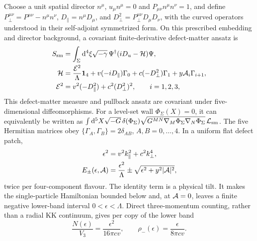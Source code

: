\documentclass[10pt]{article}
\newcommand{\dd}{\mathrm{d}}
\begin{document}
Choose a unit spatial director $n^\mu$, $u_\mu n^\mu=0$ and
$P_{\mu\nu}n^\mu n^\nu=1$, and define
$P_\perp^{\mu\nu}=P^{\mu\nu}-n^\mu n^\nu$,
$D_\parallel=n^\mu D_\mu$, and
$D_\perp^2=P_\perp^{\mu\nu}D_\mu D_\nu$, with the curved operators understood
in their self-adjoint symmetrized form.  On this prescribed embedding and
director background, a covariant finite-derivative defect-matter ansatz is
\begin{equation}
 \begin{aligned}
 S_{\rm sm}&=\int_\Sigma\dd^4\xi\sqrt{-\gamma}\,
 \Psi^\dagger(iD_u-{\cal H})\Psi,\\
 {\cal H}&=\frac{{\cal E}^2}{\Lambda}\mathbf1_4
 +v(-iD_\parallel)\Gamma_0+c(-D_\perp^2)\Gamma_1
 +y{\cal A}_i\Gamma_{i+1},\\
 {\cal E}^2&=v^2(-D_\parallel^2)+c^2(D_\perp^2)^2,
 \qquad i=1,2,3,
 \end{aligned}
 \label{eq:tiltedsemimetalaction}
\end{equation}
This defect-matter measure and pullback ansatz are covariant under
five-dimensional diffeomorphisms.  For
a level-set wall $\Phi_\Sigma(X)=0$, it can equivalently be written as
$\int\dd^5X\sqrt{-G}\,\delta(\Phi_\Sigma)
\sqrt{G^{MN}\nabla_M\Phi_\Sigma\nabla_N\Phi_\Sigma}\,{\cal L}_{\rm sm}$.
The five Hermitian matrices obey
$\{\Gamma_A,\Gamma_B\}=2\delta_{AB}$, $A,B=0,\ldots,4$.  In a uniform flat
defect patch,
\begin{equation}
 \begin{aligned}
 \epsilon^2&=v^2k_\parallel^2+c^2k_\perp^4,\\
 E_\pm(\epsilon,{\cal A})&=\frac{\epsilon^2}{\Lambda}
 \pm\sqrt{\epsilon^2+y^2|{\cal A}|^2},
 \end{aligned}
 \label{eq:tiltedsemimetalspectrum}
\end{equation}
twice per four-component flavour.  The identity term is a physical tilt.  It
makes the single-particle Hamiltonian bounded below and, at ${\cal A}=0$,
leaves a finite negative lower-band interval $0<\epsilon<\Lambda$.  Direct
three-momentum counting, rather than a radial KK continuum, gives per copy of
the lower band
\begin{equation}
 \frac{N(\epsilon)}{V_3}=\frac{\epsilon^2}{16\pi cv},
 \qquad \rho_-(\epsilon)=\frac{\epsilon}{8\pi cv}.
 \label{eq:tiltedsemimetaldos}
\end{equation}
\end{document}
